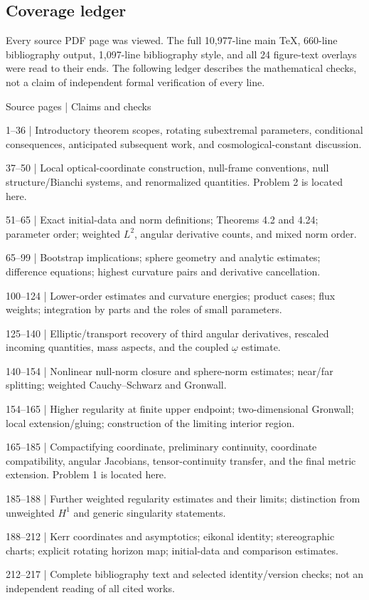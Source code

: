 \documentclass[10pt]{article}
\begin{document}
\subsection*{Coverage ledger}
Every source PDF page was viewed. The full 10,977-line main TeX, 660-line bibliography output, 1,097-line bibliography style, and all 24 figure-text overlays were read to their ends. The following ledger describes the mathematical checks, not a claim of independent formal verification of every line.\par
Source pages | Claims and checks\par
1–36 | Introductory theorem scopes, rotating subextremal parameters, conditional consequences, anticipated subsequent work, and cosmological-constant discussion.\par
37–50 | Local optical-coordinate construction, null-frame conventions, null structure/Bianchi systems, and renormalized quantities. Problem 2 is located here.\par
51–65 | Exact initial-data and norm definitions; Theorems 4.2 and 4.24; parameter order; weighted \(L^2\), angular derivative counts, and mixed norm order.\par
65–99 | Bootstrap implications; sphere geometry and analytic estimates; difference equations; highest curvature pairs and derivative cancellation.\par
100–124 | Lower-order estimates and curvature energies; product cases; flux weights; integration by parts and the roles of small parameters.\par
125–140 | Elliptic/transport recovery of third angular derivatives, rescaled incoming quantities, mass aspects, and the coupled \(\underline\omega\) estimate.\par
140–154 | Nonlinear null-norm closure and sphere-norm estimates; near/far splitting; weighted Cauchy–Schwarz and Gronwall.\par
154–165 | Higher regularity at finite upper endpoint; two-dimensional Gronwall; local extension/gluing; construction of the limiting interior region.\par
165–185 | Compactifying coordinate, preliminary continuity, coordinate compatibility, angular Jacobians, tensor-continuity transfer, and the final metric extension. Problem 1 is located here.\par
185–188 | Further weighted regularity estimates and their limits; distinction from unweighted \(H^1\) and generic singularity statements.\par
188–212 | Kerr coordinates and asymptotics; eikonal identity; stereographic charts; explicit rotating horizon map; initial-data and comparison estimates.\par
212–217 | Complete bibliography text and selected identity/version checks; not an independent reading of all cited works.\par
\end{document}
